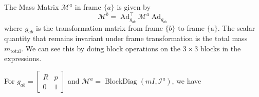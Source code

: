The Mass Matrix \( \mathcal{M}^{a} \) in frame \( \{a\} \) is given by
\begin{equation*}
    \mathcal{M}^{b}
    =
    \operatorname{Ad}_{g_{a b}}^{\top}
    \mathcal{M}^{a}
    \operatorname{Ad}_{g_{a b}}
\end{equation*}
where \( g_{a b} \) is the transformation matrix from frame \( \{b\} \) to frame \( \{\mathrm{a}\} \).
The scalar quantity that remains invariant under frame transformation is the total mass \( m_{\text{total}} \).
We can see this by doing block operations on the \( 3 \times 3 \) blocks in the expressions.

For \( g_{ab} = \begin{bmatrix}
    R & p \\
    0 & 1
\end{bmatrix}
\) and \( \mathcal{M}^{a} = \operatorname{BlockDiag}\left(m I, \mathcal{I}^{a}\right) \), we have
